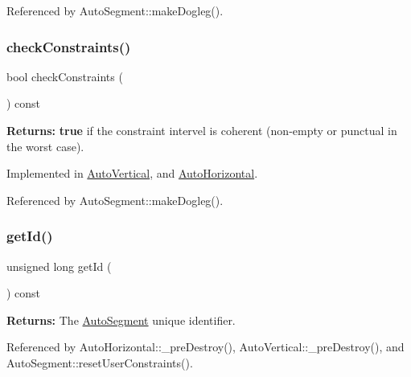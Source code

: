Referenced by Auto\+Segment\+::make\+Dogleg().

\mbox{\label{classKatabatic_1_1AutoSegment_a3d5732fd10b4a05076981066a4674487}} 
\subsubsection{\texorpdfstring{check\+Constraints()}{checkConstraints()}}
{\footnotesize\ttfamily bool check\+Constraints (\begin{DoxyParamCaption}{ }\end{DoxyParamCaption}) const\hspace{0.3cm}{\ttfamily [pure virtual]}}

{\bfseries Returns\+:} {\bfseries true} if the constraint intervel is coherent (non-\/empty or punctual in the worst case). 

Implemented in \hyperlink{classKatabatic_1_1AutoVertical_a8aef8f4bbafe3426840f9ebf31bb3b81}{Auto\+Vertical}, and \hyperlink{classKatabatic_1_1AutoHorizontal_a8aef8f4bbafe3426840f9ebf31bb3b81}{Auto\+Horizontal}.



Referenced by Auto\+Segment\+::make\+Dogleg().

\mbox{\label{classKatabatic_1_1AutoSegment_afdedcef127ad2a3677a5b48d7d3453f3}} 
\subsubsection{\texorpdfstring{get\+Id()}{getId()}}
{\footnotesize\ttfamily unsigned long get\+Id (\begin{DoxyParamCaption}{ }\end{DoxyParamCaption}) const\hspace{0.3cm}{\ttfamily [inline]}}

{\bfseries Returns\+:} The \hyperlink{classKatabatic_1_1AutoSegment}{Auto\+Segment} unique identifier. 

Referenced by Auto\+Horizontal\+::\+\_\+pre\+Destroy(), Auto\+Vertical\+::\+\_\+pre\+Destroy(), and Auto\+Segment\+::reset\+User\+Constraints().

